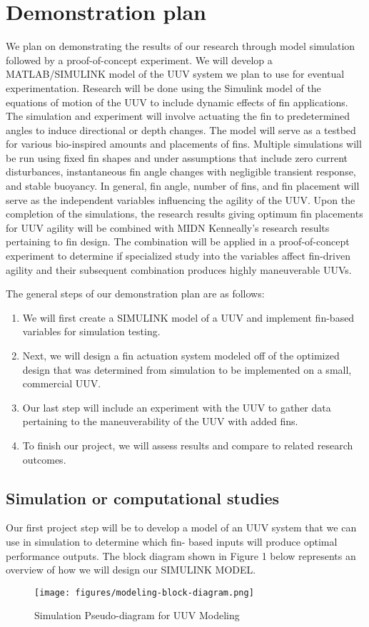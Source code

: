 \documentclass{IEEEtran}
\begin{document}
\section{Demonstration plan}
We plan on demonstrating the results of our research through model simulation followed by a proof-of-concept experiment. We will develop a MATLAB/SIMULINK model of the UUV system we plan to use for eventual experimentation. Research will be done using the Simulink model of the equations of motion of the UUV to include dynamic effects of fin applications. The simulation and experiment will involve actuating the fin to predetermined angles to induce directional or depth changes. The model will serve as a testbed for various bio-inspired amounts and placements of fins. Multiple simulations will be run using fixed fin shapes and under assumptions that include zero current disturbances, instantaneous fin angle changes with negligible transient response, and stable buoyancy. In general, fin angle, number of fins, and fin placement will serve as the independent variables influencing the agility of the UUV. Upon the completion of the simulations, the research results giving optimum fin placements for UUV agility will be combined with MIDN Kenneally’s research results pertaining to fin design. The combination will be applied in a proof-of-concept experiment to determine if specialized study into the variables affect fin-driven agility and their subsequent combination produces highly maneuverable UUVs.

The general steps of our demonstration plan are as follows:
\begin{enumerate}
\item We will first create a SIMULINK model of a UUV and implement fin-based variables for simulation testing.
\item Next, we will design a fin actuation system modeled off of the optimized design that was determined from
simulation to be implemented on a small, commercial UUV.
\item Our last step will include an experiment with the UUV to gather data pertaining to the maneuverability of the
UUV with added fins.
\item To finish our project, we will assess results and compare to related research outcomes.
\end{enumerate}

\subsection{Simulation or computational studies}
Our first project step will be to develop a model of an UUV system that we can use in simulation to determine which fin- based inputs will produce optimal performance outputs. The block diagram shown in Figure 1 below represents an overview of how we will design our SIMULINK MODEL.
\begin{figure*}
\begin{center}
\texttt{[image: figures/modeling-block-diagram.png]}
\end{center}
\caption{Simulation Pseudo-diagram for UUV Modeling}
\label{fig:4}
\end{figure*}
\end{document}
